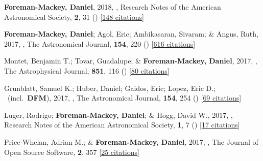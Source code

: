 \item[{\color{numcolor}\scriptsize32}] \textbf{Foreman-Mackey, Daniel}, 2018, , Research Notes of the American Astronomical Society, \textbf{2}, 31 () [\href{https://ui.adsabs.harvard.edu/abs/2018RNAAS...2...31F}{148 citations}]

\item[{\color{numcolor}\scriptsize31}] \textbf{Foreman-Mackey, Daniel}; Agol, Eric; Ambikasaran, Sivaram; \& Angus, Ruth, 2017, , The Astronomical Journal, \textbf{154}, 220 () [\href{https://ui.adsabs.harvard.edu/abs/2017AJ....154..220F}{616 citations}]

\item[{\color{numcolor}\scriptsize30}] Montet, Benjamin T.; Tovar, Guadalupe; \& \textbf{Foreman-Mackey, Daniel}, 2017, , The Astrophysical Journal, \textbf{851}, 116 () [\href{https://ui.adsabs.harvard.edu/abs/2017ApJ...851..116M}{80 citations}]

\item[{\color{numcolor}\scriptsize29}] Grunblatt, Samuel K.; Huber, Daniel; Gaidos, Eric; Lopez, Eric D.; \etal\ (incl.\ \textbf{DFM}), 2017, , The Astronomical Journal, \textbf{154}, 254 () [\href{https://ui.adsabs.harvard.edu/abs/2017AJ....154..254G}{69 citations}]

\item[{\color{numcolor}\scriptsize28}] Luger, Rodrigo; \textbf{Foreman-Mackey, Daniel}; \& Hogg, David W., 2017, , Research Notes of the American Astronomical Society, \textbf{1}, 7 () [\href{https://ui.adsabs.harvard.edu/abs/2017RNAAS...1....7L}{17 citations}]

\item[{\color{numcolor}\scriptsize27}] Price-Whelan, Adrian M.; \& \textbf{Foreman-Mackey, Daniel}, 2017, , The Journal of Open Source Software, \textbf{2}, 357 [\href{https://ui.adsabs.harvard.edu/abs/2017JOSS....2..357P}{25 citations}]

